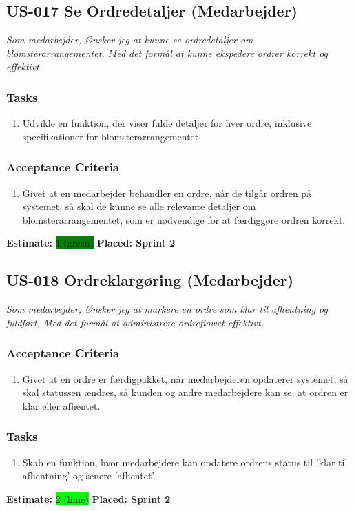 \subsection{US-017 Se Ordredetaljer (Medarbejder)}
\label{sec:US-017}
\textit{Som medarbejder, Ønsker jeg at kunne se ordredetaljer om blomsterarrangementet, Med det formål at kunne ekspedere ordrer korrekt og effektivt.}
\subsubsection*{\textbf{Tasks}}
\begin{enumerate}
  \item Udvikle en funktion, der viser fulde detaljer for hver ordre, inklusive specifikationer for blomsterarrangementet.
\end{enumerate}
\subsubsection*{\textbf{Acceptance Criteria}}
\begin{enumerate}
  \item Givet at en medarbejder behandler en ordre, når de tilgår ordren på systemet, så skal de kunne se alle relevante detaljer om blomsterarrangementet, som er nødvendige for at færdiggøre ordren korrekt.
\end{enumerate}
\textbf{Estimate:} \colorbox{green}{1 (green)}
\textbf{Placed: Sprint 2}
\par\noindent\dotfill

\subsection{US-018 Ordreklargøring (Medarbejder)}
\label{sec:US-018}
\textit{Som medarbejder, Ønsker jeg at markere en ordre som klar til afhentning og fuldført, Med det formål at administrere ordreflowet effektivt.}
\subsubsection*{\textbf{Acceptance Criteria}}
\begin{enumerate}
  \item Givet at en ordre er færdigpakket, når medarbejderen opdaterer systemet, så skal statussen ændres, så kunden og andre medarbejdere kan se, at ordren er klar eller afhentet.
\end{enumerate}
\subsubsection*{\textbf{Tasks}}
\begin{enumerate}
  \item Skab en funktion, hvor medarbejdere kan opdatere ordrens status til 'klar til afhentning' og senere 'afhentet'.
\end{enumerate}
\textbf{Estimate:} \colorbox{lime}{2 (lime)}
\textbf{Placed: Sprint 2}
\par\noindent\dotfill
